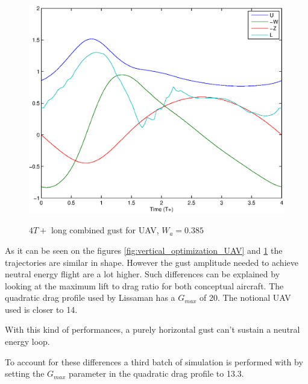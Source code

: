 \begin{figure}[h]
	\begin{center}
		\scalebox{0.8}
		{\includegraphics{./Figures/Windtype=3_Tg=4_Wg=0p385_UAV_alphamax=12.eps}}
	\end{center}
	\caption{$4T+$ long combined gust for UAV, $W_a=0.385$}
	\label{fig:combined_optimization_UAV}
\end{figure}

As it can be seen on the figures \ref{fig:vertical_optimization_UAV} and \ref{fig:combined_optimization_UAV} the trajectories are similar in shape. However the gust amplitude needed to achieve neutral energy flight are a lot higher.
Such differences can be explained by looking at the maximum lift to drag ratio for both conceptual aircraft.
The quadratic drag profile used by Lissaman has a $G_{max}$ of 20.
The notional UAV used is closer to 14.

\FloatBarrier

\par With this kind of performances, a purely horizontal gust can't sustain a neutral energy loop.


\par To account for these differences a third batch of simulation is performed with by setting the $G_{max}$ parameter in the quadratic drag profile to 13.3.

